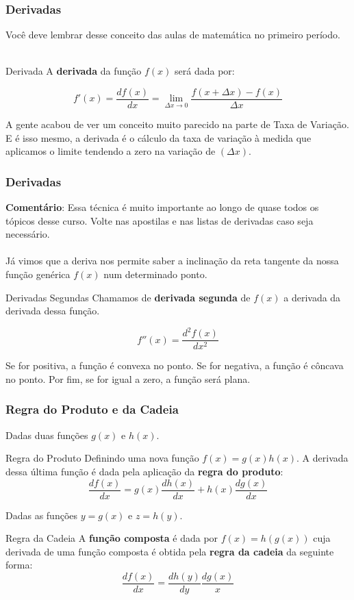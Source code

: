 \documentclass{beamer}[10]
\begin{document}
\begin{frame}
	\frametitle{Derivadas}

	Você deve lembrar desse conceito das aulas de matemática no primeiro período.
	\\~\\
	\begin{block}{Derivada}
		A \textbf{derivada} da função $f(x)$ será dada por:

		$$ f'(x) = \frac{df(x)}{dx} = \lim_{\Delta x \to 0} \frac{f(x + \Delta x) - f(x)}{\Delta x} $$
	\end{block}
	A gente acabou de ver um conceito muito parecido na parte de Taxa de Variação. E é isso mesmo, a derivada é o cálculo da taxa de variação à medida que aplicamos o limite tendendo a zero na variação de $(\Delta x)$.
\end{frame}

\begin{frame}
	\frametitle{Derivadas}

	\textbf{Comentário}: Essa técnica é muito importante ao longo de quase todos os tópicos desse curso. Volte nas apostilas e nas listas de derivadas caso seja necessário.
	\\~\\
	Já vimos que a deriva nos permite saber a inclinação da reta tangente da nossa função genérica $f(x)$ num determinado ponto.
	
	\begin{block}{Derivadas Segundas}
		Chamamos de \textbf{derivada segunda} de $f(x)$ a derivada da derivada dessa função.

		$$ f''(x) = \frac{d^2f(x)}{dx^2} $$
	\end{block}

	Se for positiva, a função é convexa no ponto. Se for negativa, a função é côncava no ponto. Por fim, se for igual a zero, a função será plana.
\end{frame}

\begin{frame}
	\frametitle{Regra do Produto e da Cadeia}

	Dadas duas funções $g(x)$ e $h(x)$.

	\begin{block}{Regra do Produto}
		Definindo uma nova função $f(x) = g(x) h(x)$. A derivada dessa última função é dada pela aplicação da \textbf{regra do produto}:
		$$ \frac{df(x)}{dx} = g(x)\frac{dh(x)}{dx} + h(x)\frac{dg(x)}{dx}$$
	\end{block}

	Dadas as funções $y = g(x)$ e $z = h(y)$.

	\begin{block}{Regra da Cadeia}
		A \textbf{função composta} é dada por $f(x) = h(g(x))$ cuja derivada de uma função composta é obtida pela \textbf{regra da cadeia} da seguinte forma:
		$$ \frac{df(x)}{dx} = \frac{dh(y)}{dy}\frac{dg(x)}{x}$$
	\end{block}
\end{frame}
\end{document}
